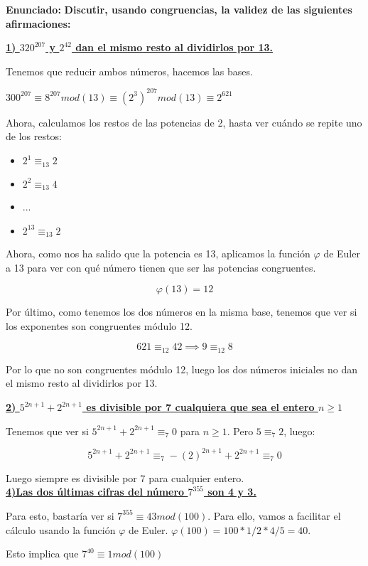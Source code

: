 \documentclass[11pt, a4paper, titlepage]{article}
\begin{document}
\textbf{Enunciado:}\textbf{ Discutir, usando congruencias, la validez de las siguientes afirmaciones:}

\underline{\textbf{1) $320^{207}$ y $2^{42}$ dan el mismo resto al dividirlos por 13.}}

Tenemos que reducir ambos números, hacemos las bases.

$300^{207}\equiv 8^{207}mod(13) \equiv (2^3)^{207} mod(13) \equiv 2^{621}$

Ahora, calculamos los restos de las potencias de 2, hasta ver cuándo se repite uno de los restos:

\begin{itemize}
	\item $2^1 \equiv_{13} 2$
	\item $2^2 \equiv_{13} 4$
	\item ...
	\item $2^{13} \equiv_{13} 2$
\end{itemize}

Ahora, como nos ha salido que la potencia es 13, aplicamos la función $\varphi$ de Euler a 13 para ver con qué número tienen que ser las potencias congruentes.

\[
\varphi(13) = 12
\]

Por último, como tenemos los dos números en la misma base, tenemos que ver si los exponentes son congruentes módulo 12.

\[
621 \equiv_{12} 42 \implies 9 \equiv_{12} 8
\]

Por lo que no son congruentes módulo 12, luego los dos números iniciales no dan el mismo resto al dividirlos por 13.

\textbf{\underline{2) $5^{2n+1} + 2^{2n+1}$ es divisible por 7 cualquiera que sea el entero $n \geq 1$}}

Tenemos que ver si $5^{2n+1} + 2^{2n+1} \equiv_7 0$ para $n\geq 1$. Pero $5\equiv_7 2$, luego:

\[
5^{2n+1} + 2^{2n+1} \equiv_7 -(2)^{2n+1} + 2^{2n+1} \equiv_7 0
\]

Luego siempre es divisible por 7 para cualquier entero.\\


\underline{\textbf{4)Las dos últimas cifras del número $7^{355}$ son 4 y 3.}}

Para esto, bastaría ver si $7^{355} \equiv 43 mod(100)$. Para ello, vamos a facilitar el cálculo usando la función $\varphi$ de Euler. $\varphi(100) = 100*1/2 * 4/5 = 40$.

Esto implica que $ 7^{40} \equiv 1 mod(100)$
\end{document}
